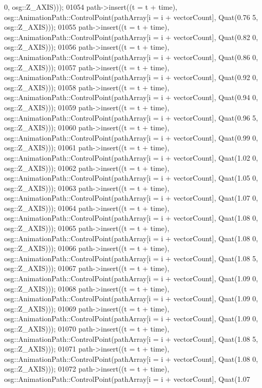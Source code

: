 \begin{DoxyCode}
      0, osg::Z\_AXIS)));
01054     path->insert((t = t + time), osg::AnimationPath::ControlPoint(pathArray[i = i + vectorCount], Quat(0.76
      5, osg::Z\_AXIS)));
01055     path->insert((t = t + time), osg::AnimationPath::ControlPoint(pathArray[i = i + vectorCount], Quat(0.82
      0, osg::Z\_AXIS)));
01056     path->insert((t = t + time), osg::AnimationPath::ControlPoint(pathArray[i = i + vectorCount], Quat(0.86
      0, osg::Z\_AXIS)));
01057     path->insert((t = t + time), osg::AnimationPath::ControlPoint(pathArray[i = i + vectorCount], Quat(0.92
      0, osg::Z\_AXIS)));
01058     path->insert((t = t + time), osg::AnimationPath::ControlPoint(pathArray[i = i + vectorCount], Quat(0.94
      0, osg::Z\_AXIS)));
01059     path->insert((t = t + time), osg::AnimationPath::ControlPoint(pathArray[i = i + vectorCount], Quat(0.96
      5, osg::Z\_AXIS)));
01060     path->insert((t = t + time), osg::AnimationPath::ControlPoint(pathArray[i = i + vectorCount], Quat(0.99
      0, osg::Z\_AXIS)));
01061     path->insert((t = t + time), osg::AnimationPath::ControlPoint(pathArray[i = i + vectorCount], Quat(1.02
      0, osg::Z\_AXIS)));
01062     path->insert((t = t + time), osg::AnimationPath::ControlPoint(pathArray[i = i + vectorCount], Quat(1.05
      0, osg::Z\_AXIS)));
01063     path->insert((t = t + time), osg::AnimationPath::ControlPoint(pathArray[i = i + vectorCount], Quat(1.07
      0, osg::Z\_AXIS)));
01064     path->insert((t = t + time), osg::AnimationPath::ControlPoint(pathArray[i = i + vectorCount], Quat(1.08
      0, osg::Z\_AXIS)));
01065     path->insert((t = t + time), osg::AnimationPath::ControlPoint(pathArray[i = i + vectorCount], Quat(1.08
      0, osg::Z\_AXIS)));
01066     path->insert((t = t + time), osg::AnimationPath::ControlPoint(pathArray[i = i + vectorCount], Quat(1.08
      5, osg::Z\_AXIS)));
01067     path->insert((t = t + time), osg::AnimationPath::ControlPoint(pathArray[i = i + vectorCount], Quat(1.09
      0, osg::Z\_AXIS)));
01068     path->insert((t = t + time), osg::AnimationPath::ControlPoint(pathArray[i = i + vectorCount], Quat(1.09
      0, osg::Z\_AXIS)));
01069     path->insert((t = t + time), osg::AnimationPath::ControlPoint(pathArray[i = i + vectorCount], Quat(1.09
      0, osg::Z\_AXIS)));
01070     path->insert((t = t + time), osg::AnimationPath::ControlPoint(pathArray[i = i + vectorCount], Quat(1.08
      5, osg::Z\_AXIS)));
01071     path->insert((t = t + time), osg::AnimationPath::ControlPoint(pathArray[i = i + vectorCount], Quat(1.08
      0, osg::Z\_AXIS)));
01072     path->insert((t = t + time), osg::AnimationPath::ControlPoint(pathArray[i = i + vectorCount], Quat(1.07

\end{DoxyCode}
